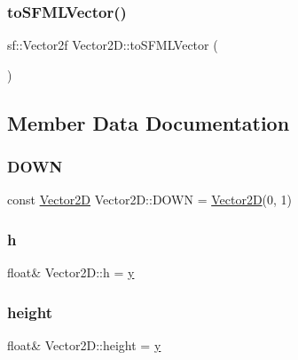 \hypertarget{class_vector2_d_ad586df868be4520798c5783e317adbeb}{}\label{class_vector2_d_ad586df868be4520798c5783e317adbeb} 
\subsubsection{\texorpdfstring{to\+S\+F\+M\+L\+Vector()}{toSFMLVector()}}
{\footnotesize\ttfamily sf\+::\+Vector2f Vector2\+D\+::to\+S\+F\+M\+L\+Vector (\begin{DoxyParamCaption}{ }\end{DoxyParamCaption})}



\subsection{Member Data Documentation}
\hypertarget{class_vector2_d_a7c995f75e1c94be2be0d4cc930dad709}{}\label{class_vector2_d_a7c995f75e1c94be2be0d4cc930dad709} 
\subsubsection{\texorpdfstring{D\+O\+WN}{DOWN}}
{\footnotesize\ttfamily const \hyperlink{class_vector2_d}{Vector2D} Vector2\+D\+::\+D\+O\+WN = \hyperlink{class_vector2_d}{Vector2D}(0, 1)\hspace{0.3cm}{\ttfamily [static]}}

\hypertarget{class_vector2_d_a8de2b56d13d0f0a7f9357dc42eef731e}{}\label{class_vector2_d_a8de2b56d13d0f0a7f9357dc42eef731e} 
\subsubsection{\texorpdfstring{h}{h}}
{\footnotesize\ttfamily float\& Vector2\+D\+::h = \hyperlink{class_vector2_d_a85215519d3f71d0e6be7d636346f3b7d}{y}}

\hypertarget{class_vector2_d_a725dfed5745aa8176cd39ae334536bae}{}\label{class_vector2_d_a725dfed5745aa8176cd39ae334536bae} 
\subsubsection{\texorpdfstring{height}{height}}
{\footnotesize\ttfamily float\& Vector2\+D\+::height = \hyperlink{class_vector2_d_a85215519d3f71d0e6be7d636346f3b7d}{y}}

